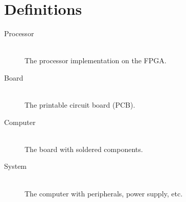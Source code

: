 \section{Definitions}

\begin{description}
    \item[Processor]
    \hfill\\
    The processor implementation on the FPGA.
    \item[Board]
    \hfill\\
    The printable circuit board (PCB).
    \item[Computer]
    \hfill\\
    The board with soldered components.
    \item[System]
    \hfill\\
    The computer with peripherals, power supply, etc.
\end{description}

